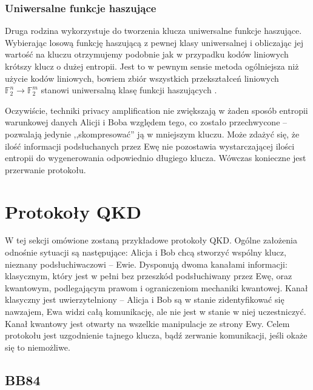 \documentclass[10pt]{article}
\begin{document}
\subsubsection*{Uniwersalne funkcje haszujące}

Druga rodzina wykorzystuje do tworzenia klucza uniwersalne funkcje haszujące\cite{Bennett95,Watanabe07}.
Wybierając losową funkcję haszującą z pewnej klasy uniwersalnej i obliczając jej wartość na kluczu
otrzymujemy podobnie jak w przypadku kodów liniowych krótszy klucz o dużej entropii. Jest to w pewnym
sensie metoda ogólniejsza niż użycie kodów liniowych, bowiem zbiór wszystkich przekształceń liniowych
\(\mathbb{F}_2^n\rightarrow \mathbb{F}_2^m\) stanowi uniwersalną klasę funkcji haszujących 
\cite{Carter79}.

\vspace{3mm}

Oczywiście, techniki privacy amplification nie zwiększają w żaden sposób entropii warunkowej danych
Alicji i Boba względem tego, co zostało przechwycone -- pozwalają jedynie ,,skompresować'' ją w
mniejszym kluczu. Może zdażyć się, że ilość informacji podsłuchanych przez Ewę nie pozostawia 
wystarczającej ilości entropii do wygenerowania odpowiednio długiego klucza. Wówczas konieczne jest
przerwanie protokołu. 


\section{Protokoły QKD}

W tej sekcji omówione zostaną przykładowe protokoły QKD. Ogólne założenia odnośnie sytuacji są
następujące: Alicja i Bob chcą stworzyć wspólny klucz, nieznany podsłuchiwaczowi -- Ewie. Dysponują
dwoma kanałami informacji: klasycznym, który jest w pełni bez przeszkód podsłuchiwany przez Ewę,
oraz kwantowym, podlegającym prawom i ograniczeniom mechaniki kwantowej. Kanał klasyczny jest
uwierzytelniony -- Alicja i Bob są w stanie zidentyfikować się nawzajem, Ewa widzi całą komunikację,
ale nie jest w stanie w niej uczestniczyć\footnotemark. Kanał kwantowy jest otwarty na wszelkie 
manipulacje ze strony Ewy. Celem protokołu jest uzgodnienie tajnego klucza, bądź zerwanie komunikacji,
jeśli okaże się to niemożliwe.


\subsection{BB84}
\end{document}
